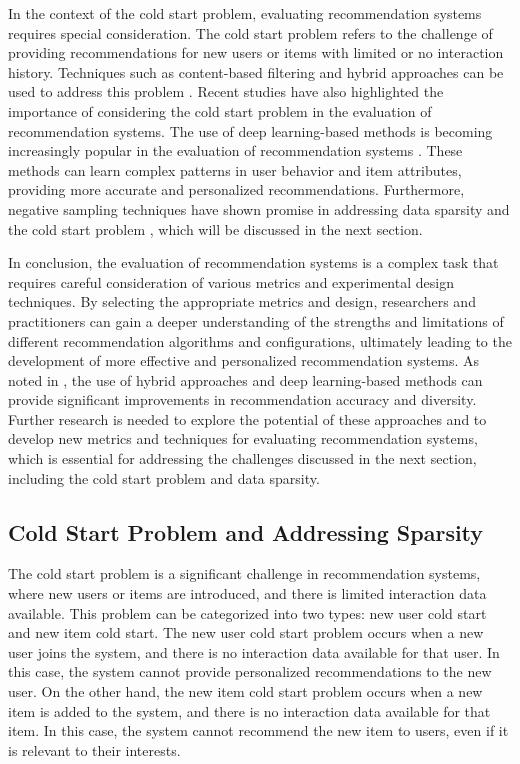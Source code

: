 \documentclass[11pt,a4paper]{article}
\begin{document}
In the context of the cold start problem, evaluating recommendation systems requires special consideration. The cold start problem refers to the challenge of providing recommendations for new users or items with limited or no interaction history. Techniques such as content-based filtering and hybrid approaches can be used to address this problem \cite{doi:10.1016/j.knosys.2011.07.021}. Recent studies have also highlighted the importance of considering the cold start problem in the evaluation of recommendation systems. The use of deep learning-based methods is becoming increasingly popular in the evaluation of recommendation systems \cite{arxiv:1707.07435}. These methods can learn complex patterns in user behavior and item attributes, providing more accurate and personalized recommendations. Furthermore, negative sampling techniques have shown promise in addressing data sparsity and the cold start problem \cite{doi:10.1145/3331184.3331337}, which will be discussed in the next section.

In conclusion, the evaluation of recommendation systems is a complex task that requires careful consideration of various metrics and experimental design techniques. By selecting the appropriate metrics and design, researchers and practitioners can gain a deeper understanding of the strengths and limitations of different recommendation algorithms and configurations, ultimately leading to the development of more effective and personalized recommendation systems. As noted in \cite{doi:10.24963/ijcai.2017/446}, the use of hybrid approaches and deep learning-based methods can provide significant improvements in recommendation accuracy and diversity. Further research is needed to explore the potential of these approaches and to develop new metrics and techniques for evaluating recommendation systems, which is essential for addressing the challenges discussed in the next section, including the cold start problem and data sparsity.


\subsection{Cold Start Problem and Addressing Sparsity}


The cold start problem is a significant challenge in recommendation systems, where new users or items are introduced, and there is limited interaction data available. This problem can be categorized into two types: new user cold start and new item cold start. The new user cold start problem occurs when a new user joins the system, and there is no interaction data available for that user. In this case, the system cannot provide personalized recommendations to the new user. On the other hand, the new item cold start problem occurs when a new item is added to the system, and there is no interaction data available for that item. In this case, the system cannot recommend the new item to users, even if it is relevant to their interests.
\end{document}
